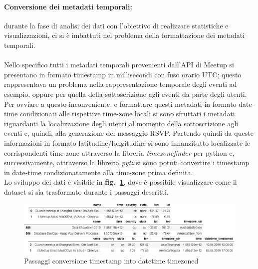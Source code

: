 \documentclass[fleqn,10pt]{SelfArx} %
\begin{document}
{{\paragraph{Conversione dei metadati temporali:} durante la fase di analisi dei dati con l'obiettivo di realizzare statistiche e visualizzazioni, ci si è imbattuti nel problema della formattazione dei metadati temporali. \\
\\Nello specifico tutti i metadati temporali provenienti dall'API di Meetup si presentano in formato timestamp in millisecondi con fuso orario UTC; questo rappresentava un problema nella rappresentazione temporale degli eventi ad esempio, oppure per quella della sottoscrizione agli eventi da parte degli utenti. 
\\Per ovviare a questo inconveniente, e formattare questi metadati in formato date-time condizionati alle rispettive time-zone locali si sono sfruttati i metadati riguardanti la localizzazione degli utenti al momento della sottoscrizione agli eventi e, quindi, alla generazione del messaggio RSVP. 
Partendo quindi da queste informazioni in formato latitudine/longitudine si sono innanzitutto localizzate le corrispondenti time-zone attraverso la libreria \textit{timezonefinder} per python e, successivamente, attraverso la libreria \textit{pytz} si sono potuti convertire i timestamp in date-time condizionatamente alla time-zone prima definita. \\
Lo sviluppo dei dati è visibile in \textbf{fig.~\ref{datetime_timezoned}}, dove è possibile visualizzare come il dataset si sia trasformato durante i passaggi descritti.
\begin{figure}
\centering
\includegraphics[width = 9 cm, height = 3.5 cm]{datetime_timezoned.PNG}
\vspace*{0.01cm}
\caption{\footnotesize \label{datetime_timezoned} Passaggi conversione timestamp into datetime timezoned}
\end{figure}
}}
\end{document}
